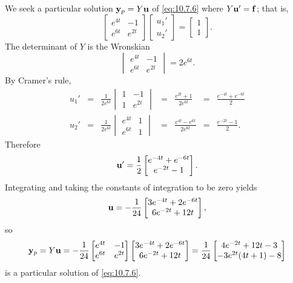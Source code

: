\documentclass{ximera}
\begin{document}
\begin{example}
\begin{explanation}
We seek a particular solution
${\bf y}_p=Y{\bf u}$ of \eqref{eq:10.7.6} where
 $Y{\bf u}'={\bf f}$; that is,
$$
\begin{bmatrix} e^{4t}&-1\\e^{6t}&e^{2t}\end{bmatrix}
\begin{bmatrix}u_1'\\u_2'\end{bmatrix}=\begin{bmatrix}1\\1\end{bmatrix}.
$$
The determinant of $Y$ is the Wronskian
$$
\begin{vmatrix}
e^{4t}&-1\\e^{6t}&e^{2t}\end{vmatrix}=2e^{6t}.
$$
By Cramer's rule,
$$
\begin{array}{cccccll}
u_1'&=&\frac{1}{2e^{6t}}\begin{vmatrix}1&-1\\1&e^{2t}
\end{vmatrix}&=&\frac{e^{2t}+1}{2e^{6t}}&=&\frac{e^{-4t}+e^{-6t}}{2}
\\
u_2'&=&\frac{1}{2e^{6t}}\begin{vmatrix}e^{4t}&1\\e^{6t}&1
\end{vmatrix}&=&\frac{e^{4t}-e^{6t}}{2e^{6t}}&=&\frac{e^{-2t}-1}{2}.
\end{array}
$$
Therefore
$$
{\bf
u}'=\frac{1}{2}\begin{bmatrix}e^{-4t}+e^{-6t}\\e^{-2t}-1\end{bmatrix}.
$$
Integrating  and taking the constants of integration to be zero yields
$$
{\bf
u}=-\frac{1}{24}\begin{bmatrix}3e^{-4t}+2e^{-6t}\\6e^{-2t}+12t\end{bmatrix},
$$
so
$$
{\bf y}_p=Y{\bf u}=
-\frac{1}{24}\begin{bmatrix}e^{4t}&-1\\e^{6t}&e^{2t}\end{bmatrix}
\begin{bmatrix}3e^{-4t}+2e^{-6t}\\6e^{-2t}+12t\end{bmatrix}
=\frac{1}{24}\begin{bmatrix}4e^{-2t}+12t-3\\-3e^{2t}(4t+1)-8\end{bmatrix}
$$
is a particular solution of  \eqref{eq:10.7.6}.
\end{explanation}
\end{example}
\end{document}
